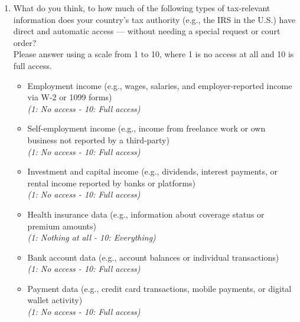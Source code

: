 \documentclass[11pt]{article}
\begin{document}
\begin{enumerate}[resume]
    \item What do you think, to how much of the following types of tax-relevant information does your country’s tax authority (e.g., the IRS in the U.S.) have direct and automatic access — without needing a special request or court order? \\ 
    Please answer using a scale from 1 to 10, where 1 is no access at all and 10 is full access.
    \begin{itemize}
        \item Employment income (e.g., wages, salaries, and employer-reported income via W-2 or 1099 forms) \\ \textit{(1: No access - 10: Full access)}
        \item Self-employment income (e.g., income from freelance work or own business not reported by a third-party) \\ \textit{(1: No access - 10: Full access)}
        \item Investment and capital income (e.g., dividends, interest payments, or rental income reported by banks or platforms) \\ \textit{(1: No access - 10: Full access)}
        \item Health insurance data (e.g., information about coverage status or premium amounts) \\ \textit{(1: Nothing at all - 10: Everything)}
        \item Bank account data (e.g., account balances or individual transactions) \\ \textit{(1: No access - 10: Full access)}
        \item Payment data (e.g., credit card transactions, mobile payments, or digital wallet activity) \\ \textit{(1: No access - 10: Full access)}
    \end{itemize}
\end{enumerate}
\end{document}

